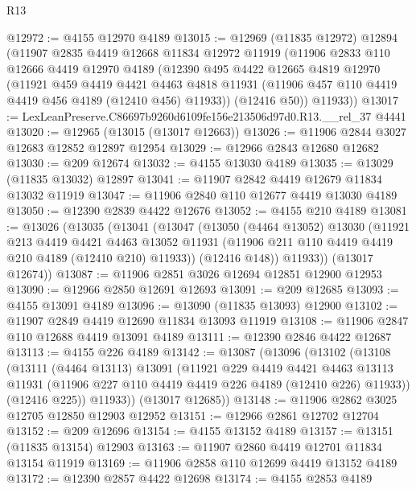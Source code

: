 \begin{lexlean}{R13}
\begin{coremodule}
@12972 := @4155 @12970 @4189
@13015 := @12969
    (@11835 @12972)
    @12894
    (@11907
      @2835
      @4419
      @12668
      @11834
      @12972
      @11919
      (@11906
        @2833
        @110
        @12666
        @4419
        @12970
        @4189
        (@12390
          @495
          @4422
          @12665
          @4819
          @12970
          (@11921
            @459
            @4419
            @4421
            @4463
            @4818
            @11931
            (@11906 @457 @110 @4419 @4419 @456 @4189 (@12410 @456) @11933))
          (@12416 @50))
        @11933))
@13017 := LexLeanPreserve.C86697b9260d6109fe156e213506d97d0.R13.__rel_37 @4441
@13020 := @12965 (@13015 (@13017 @12663))
@13026 := @11906 @2844 @3027 @12683 @12852 @12897 @12954
@13029 := @12966 @2843 @12680 @12682
@13030 := @209 @12674
@13032 := @4155 @13030 @4189
@13035 := @13029 (@11835 @13032) @12897
@13041 := @11907 @2842 @4419 @12679 @11834 @13032 @11919
@13047 := @11906 @2840 @110 @12677 @4419 @13030 @4189
@13050 := @12390 @2839 @4422 @12676
@13052 := @4155 @210 @4189
@13081 := @13026
    (@13035
      (@13041
        (@13047
          (@13050
            (@4464 @13052)
            @13030
            (@11921
              @213
              @4419
              @4421
              @4463
              @13052
              @11931
              (@11906 @211 @110 @4419 @4419 @210 @4189 (@12410 @210) @11933))
            (@12416 @148))
          @11933))
      (@13017 @12674))
@13087 := @11906 @2851 @3026 @12694 @12851 @12900 @12953
@13090 := @12966 @2850 @12691 @12693
@13091 := @209 @12685
@13093 := @4155 @13091 @4189
@13096 := @13090 (@11835 @13093) @12900
@13102 := @11907 @2849 @4419 @12690 @11834 @13093 @11919
@13108 := @11906 @2847 @110 @12688 @4419 @13091 @4189
@13111 := @12390 @2846 @4422 @12687
@13113 := @4155 @226 @4189
@13142 := @13087
    (@13096
      (@13102
        (@13108
          (@13111
            (@4464 @13113)
            @13091
            (@11921
              @229
              @4419
              @4421
              @4463
              @13113
              @11931
              (@11906 @227 @110 @4419 @4419 @226 @4189 (@12410 @226) @11933))
            (@12416 @225))
          @11933))
      (@13017 @12685))
@13148 := @11906 @2862 @3025 @12705 @12850 @12903 @12952
@13151 := @12966 @2861 @12702 @12704
@13152 := @209 @12696
@13154 := @4155 @13152 @4189
@13157 := @13151 (@11835 @13154) @12903
@13163 := @11907 @2860 @4419 @12701 @11834 @13154 @11919
@13169 := @11906 @2858 @110 @12699 @4419 @13152 @4189
@13172 := @12390 @2857 @4422 @12698
@13174 := @4155 @2853 @4189

\end{coremodule}
\end{lexlean}
